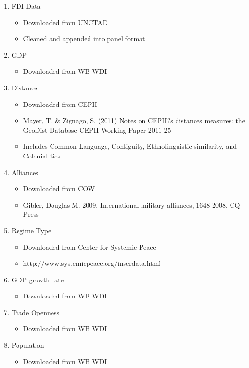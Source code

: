 \documentclass{article}
\begin{document}
\begin{enumerate}
	\item {FDI Data}
		\begin{itemize}
			\item{Downloaded from UNCTAD}
			\item{Cleaned and appended into panel format}
		\end{itemize}
	\item {GDP}
		\begin{itemize}
			\item{Downloaded from WB WDI}
		\end{itemize}
	\item {Distance}
		\begin{itemize}
			\item{Downloaded from CEPII}
			\item{Mayer, T. \& Zignago, S. (2011) Notes on CEPII?s distances measures: the GeoDist Database
					CEPII Working Paper 2011-25}
			\item{Includes Common Language, Contiguity, Ethnolinguistic similarity, and Colonial ties}
		\end{itemize}
	\item {Alliances}
		\begin{itemize}
			\item{Downloaded from COW}
			\item{Gibler, Douglas M. 2009. International military alliances, 1648-2008. CQ Press}
		\end{itemize}
	\item {Regime Type}
		\begin{itemize}
			\item{Downloaded from Center for Systemic Peace}
			\item{http://www.systemicpeace.org/inscrdata.html}
		\end{itemize}
	\item {GDP growth rate}
		\begin{itemize}
			\item{Downloaded from WB WDI}
		\end{itemize}
	\item {Trade Openness}
		\begin{itemize}
			\item{Downloaded from WB WDI}
		\end{itemize}
	\item {Population}
		\begin{itemize}
			\item{Downloaded from WB WDI}

\end{itemize}
\end{enumerate}
\end{document}
